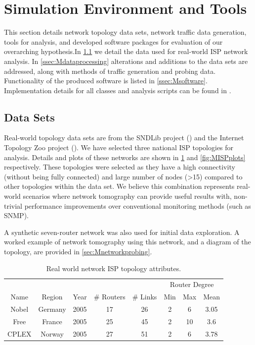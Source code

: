 \section{Simulation Environment and Tools}
\label{sec:Msimenvironment}
This section details network topology data sets, network traffic data generation, tools for analysis, and developed software packages for evaluation of our overarching hypothesis.In \cref{ssec:Mdatasets} we detail the data used for real-world ISP network analysis. In \cref{ssec:Mdataprocessing} alterations and additions to the data sets are addressed, along with methods of traffic generation and probing data. Functionality of the produced software is listed in \cref{ssec:Msoftware}. Implementation details for all classes and analysis scripts can be found in \cite{sylvester_millar_real_2021}.

\subsection{Data Sets}
\label{ssec:Mdatasets}
Real-world topology data sets are from the SNDLib project (\cite{orlowski_sndlib_2007}) and the Internet Topology Zoo project (\cite{knight_internet_2011}). We have selected three national ISP topologies for analysis. Details and plots of these networks are shown in \cref{tbl:Mrealnetworkattributes} and \cref{fig:MISPplots} respectively. These topologies were selected as they have a high connectivity (without being fully connected) and large number of nodes (>15) compared to other topologies within the data set. We believe this combination represents real-world scenarios where network tomography can provide useful results with, non-trivial performance improvements over conventional monitoring methods (such as SNMP).\par
A synthetic seven-router network was also used for initial data exploration. A worked example of network tomography using this network, and a diagram of the topology, are provided in \cref{sec:Mnetworkprobing}.\par
\begin{table}
    \centering
    \begin{tabular}{@{}cccccccc@{}} 
      \toprule
      &&&&&\multicolumn{3}{c}{Router Degree}\\
      \cmidrule{6-8}
      Name & Region & Year & \# Routers & \# Links & Min & Max & Mean \\
      \midrule
      Nobel & Germany & 2005 & 17 & 26 & 2 & 6 & 3.05\\
      Free & France & 2005 & 25 & 45 & 2 & 10 & 3.6\\
      CPLEX & Norway & 2005 & 27 & 51 & 2 & 6 & 3.78\\
      \bottomrule
    \end{tabular}
    \caption{Real world network ISP topology attributes.}
    \label{tbl:Mrealnetworkattributes}
  \end{table}

